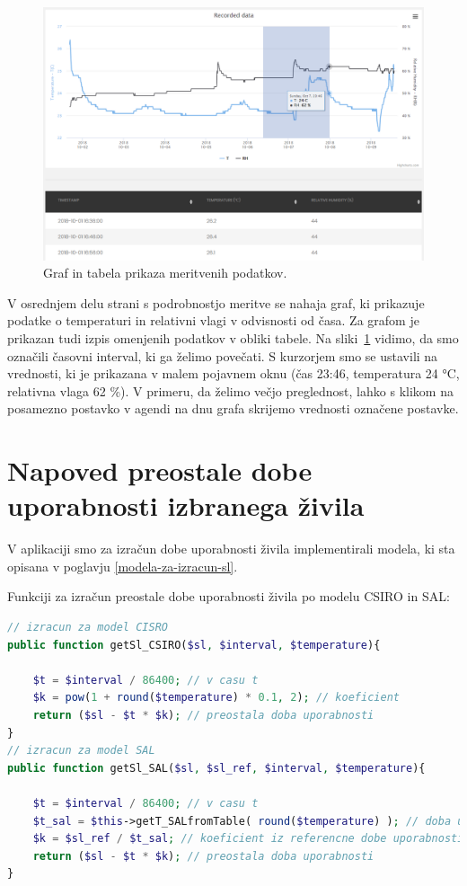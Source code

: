 \documentclass[a4paper, 12pt]{book}
\begin{document}
\begin{figure}[h]
\begin{center}
\includegraphics[width=\textwidth]{slike/record_page_2_zoom.png}
\end{center}
\caption{Graf in tabela prikaza meritvenih podatkov.}
\label{ss-record-page-zoom}
\end{figure}

V osrednjem delu strani s podrobnostjo meritve se nahaja graf, ki prikazuje podatke o temperaturi in relativni vlagi v odvisnosti od časa. Za grafom je prikazan tudi izpis omenjenih podatkov v obliki tabele.
Na sliki~\ref{ss-record-page-zoom} vidimo, da smo označili časovni interval, ki ga želimo povečati. S kurzorjem smo se ustavili na vrednosti, ki je prikazana v malem pojavnem oknu (čas 23:46, temperatura 24 °C, relativna vlaga 62 \%). V primeru, da želimo večjo preglednost, lahko s klikom na posamezno postavko v agendi na dnu grafa skrijemo vrednosti označene postavke.  

\clearpage

\section{Napoved preostale dobe uporabnosti izbranega živila}

V aplikaciji smo za izračun dobe uporabnosti živila implementirali modela, ki sta opisana v poglavju \ref{modela-za-izracun-sl}.


Funkciji za izračun preostale dobe uporabnosti živila po modelu CSIRO in SAL:

\begin{lstlisting}[language=PHP, style=mystyle]
// izracun za model CISRO
public function getSl_CSIRO($sl, $interval, $temperature){

    $t = $interval / 86400; // v casu t
    $k = pow(1 + round($temperature) * 0.1, 2); // koeficient
    return ($sl - $t * $k); // preostala doba uporabnosti
}
// izracun za model SAL
public function getSl_SAL($sl, $sl_ref, $interval, $temperature){

    $t = $interval / 86400; // v casu t
    $t_sal = $this->getT_SALfromTable( round($temperature) ); // doba uporabnosti pri temperaturi T prebrana iz tabele SAL
    $k = $sl_ref / $t_sal; // koeficient iz referencne dobe uporabnosti deljeno z $t_sal
    return ($sl - $t * $k); // preostala doba uporabnosti
}
\end{lstlisting}
\end{document}

